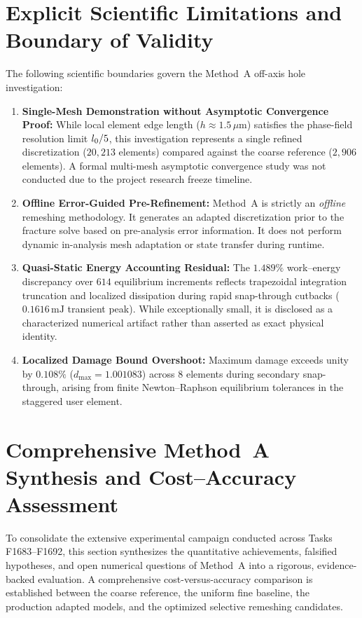 \section{Explicit Scientific Limitations and Boundary of Validity}
\label{sec:hole_limitations}

The following scientific boundaries govern the Method~A off-axis hole investigation:
\begin{enumerate}
  \item \textbf{Single-Mesh Demonstration without Asymptotic Convergence Proof:} While local element edge length ($h \approx 1.5\,\mu\mathrm{m}$) satisfies the phase-field resolution limit $l_0 / 5$, this investigation represents a single refined discretization ($20{,}213$ elements) compared against the coarse reference ($2{,}906$ elements). A formal multi-mesh asymptotic convergence study was not conducted due to the project research freeze timeline.
  \item \textbf{Offline Error-Guided Pre-Refinement:} Method~A is strictly an \emph{offline} remeshing methodology. It generates an adapted discretization prior to the fracture solve based on pre-analysis error information. It does not perform dynamic in-analysis mesh adaptation or state transfer during runtime.
  \item \textbf{Quasi-Static Energy Accounting Residual:} The $1.489\%$ work--energy discrepancy over $614$ equilibrium increments reflects trapezoidal integration truncation and localized dissipation during rapid snap-through cutbacks ($0.1616\,\mathrm{mJ}$ transient peak). While exceptionally small, it is disclosed as a characterized numerical artifact rather than asserted as exact physical identity.
  \item \textbf{Localized Damage Bound Overshoot:} Maximum damage exceeds unity by $0.108\%$ ($d_{\max} = 1.001083$) across 8 elements during secondary snap-through, arising from finite Newton--Raphson equilibrium tolerances in the staggered user element.
\end{enumerate}

\section{Comprehensive Method~A Synthesis and Cost--Accuracy Assessment}
\label{sec:method_a_comprehensive_synthesis}

To consolidate the extensive experimental campaign conducted across Tasks F1683--F1692, this section synthesizes the quantitative achievements, falsified hypotheses, and open numerical questions of Method~A into a rigorous, evidence-backed evaluation. A comprehensive cost-versus-accuracy comparison is established between the coarse reference, the uniform fine baseline, the production adapted models, and the optimized selective remeshing candidates.

